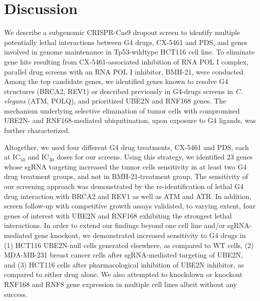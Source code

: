 \section*{Discussion}

We describe a subgenomic CRISPR-Cas9 dropout screen to identify multiple potentially lethal interactions between G4 drugs, CX-5461 and PDS, and genes involved in genome maintenance in Tp53-wildtype HCT116 cell line. To eliminate gene hits resulting from CX-5461-associated inhibition of RNA POL I complex, parallel drug screens with an RNA POL I inhibitor, BMH-21, were conducted. Among the top candidate genes, we identified genes known to resolve G4 structures (BRCA2, REV1) or described previously in G4-drugs screens in \textit{C. elegans} (ATM, POLQ), and prioritized UBE2N and RNF168 genes. The mechanism underlying selective elimination of tumor cells with compromised UBE2N- and RNF168-mediated ubiquitination, upon exposure to G4 ligands, was further characterized.

Altogether, we used four different G4 drug treatments, CX-5461 and PDS, each at IC$_{50}$ and IC$_{30}$ doses for our screens. Using this strategy, we identified 23 genes whose sgRNA targeting increased the tumor cells sensitivity in at least two G4 drug treatment groups, and not in BMH-21-treatment group. The sensitivity of our screening approach was demonstrated by the re-identification of lethal G4 drug interaction with BRCA2 and REV1\cite{Eddy2014,Zimmer2015,Xu2017} as well as ATM and ATR\cite{Negi2015a,Quin2016}. In addition, screen follow-up with competitive growth assays validated, to varying extent, four genes of interest with UBE2N and RNF168 exhibiting the strongest lethal interactions. In order to extend our findings beyond one cell line and/or sgRNA-mediated gene knockout, we demonstrated increased sensitivity to G4 drugs in (1) HCT116 UBE2N-null cells generated elsewhere\cite{Thorslund2015}, as compared to WT cells, (2) MDA-MB-231 breast cancer cells after sgRNA-mediated targeting of UBE2N, and (3) HCT116 cells after pharmacological inhibition of UBE2N inhibitor, as compared to either drug alone. We also attempted to knockdown or knockout RNF168 and RNF8 gene expression in multiple cell lines albeit without any success.  
 
